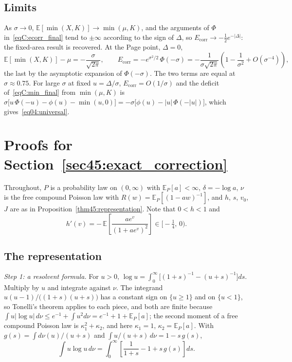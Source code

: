 \documentclass[11pt,letterpaper]{article}
\theoremstyle{plain}
\theoremstyle{definition}
\theoremstyle{remark}
\begin{document}
\subsection{Limits}
\label{subsecC:asymptotics}

As $\sigma \to 0$, $\mathbb{E}[\min(X,K)] \to \min(\mu, K)$, and the arguments of $\Phi$ in~\eqref{eqC:ecorr_final} tend to $\pm\infty$ according to the sign of $\Delta$, so $E_{\mathrm{corr}} \to -\tfrac12 e^{-|\Delta|}$: the fixed-area result is recovered. At the Page point, $\Delta = 0$,
\begin{equation}
\label{eqC:min_large_sigma}
\mathbb{E}[\min(X, K)] - \mu = -\frac{\sigma}{\sqrt{2\pi}}, \qquad
E_{\mathrm{corr}} = -e^{\sigma^2/2}\,\Phi(-\sigma) = -\frac{1}{\sigma\sqrt{2\pi}}\left(1 - \frac{1}{\sigma^2} + O(\sigma^{-4})\right),
\end{equation}
the last by the asymptotic expansion of $\Phi(-\sigma)$. The two terms are equal at $\sigma \approx 0.75$. For large $\sigma$ at fixed $u = \Delta/\sigma$, $E_{\mathrm{corr}} = O(1/\sigma)$ and the deficit of~\eqref{eqC:min_final} from $\min(\mu, K)$ is $\sigma\big[u\,\Phi(-u) - \phi(u) - \min(u, 0)\big] = -\sigma\big[\phi(u) - |u|\,\Phi(-|u|)\big]$, which gives~\eqref{eq04:universal}.

\section{Proofs for Section~\ref{sec45:exact_correction}}
\label{app:proofs}

Throughout, $P$ is a probability law on $(0,\infty)$ with $\mathbb{E}_P[a] < \infty$, $\delta = -\log a$, $\nu$ is the free compound Poisson law with $R(w) = \mathbb{E}_P[(1 - aw)^{-1}]$, and $h$, $s$, $v_0$, $J$ are as in Proposition~\ref{thm45:representation}. Note that $0 < h < 1$ and
\begin{equation}
\label{eqD:hprime}
h'(v) = -\,\mathbb{E}\!\left[\frac{a e^{v}}{(1 + a e^{v})^2}\right] \in \big[-\tfrac14,\, 0\big).
\end{equation}

\subsection{The representation}
\label{subsecD:representation}

\emph{Step 1: a resolvent formula.} For $u > 0$, $\log u = \int_0^\infty \big[(1+s)^{-1} - (u+s)^{-1}\big] ds$. Multiply by $u$ and integrate against $\nu$. The integrand $u(u-1)/\big((1+s)(u+s)\big)$ has a constant sign on $\{u \ge 1\}$ and on $\{u < 1\}$, so Tonelli's theorem applies to each piece, and both are finite because $\int u|\log u|\, d\nu \le e^{-1} + \int u^2 d\nu = e^{-1} + 1 + \mathbb{E}_P[a]$; the second moment of a free compound Poisson law is $\kappa_1^2 + \kappa_2$, and here $\kappa_1 = 1$, $\kappa_2 = \mathbb{E}_P[a]$. With $g(s) = \int d\nu(u)/(u+s)$ and $\int u/(u+s)\, d\nu = 1 - s\,g(s)$,
\begin{equation}
\label{eqD:resolvent_formula}
\int u \log u\, d\nu = \int_0^\infty \left[\frac{1}{1+s} - 1 + s\, g(s)\right] ds .
\end{equation}
\end{document}
